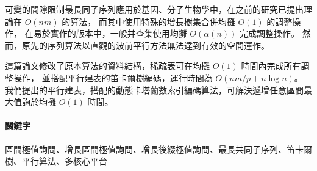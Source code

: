 \begin{abstractCH}

可變的間隙限制最長同子序列應用於基因、分子生物學中，在之前的研究已提出理論在 $O(nm)$ 的算法，
而其中使用特殊的增長樹集合併均攤 $O(1)$ 的調整操作，
在易於實作的版本中，一般并查集使用均攤 $O(\alpha(n))$ 完成調整操作。
然而，原先的序列算法以直觀的波前平行方法無法達到有效的空間運作。

這篇論文修改了原本算法的資料結構，稀疏表可在均攤 $O(1)$ 時間內完成所有調整操作，
並搭配平行建表的笛卡爾樹編碼，運行時間為 $O(nm / p + n \log n)$。
我們提出的平行建表，搭配的動態卡塔蘭數索引編碼算法，可解決遞增任意區間最大值詢於均攤 $O(1)$ 時間。

\paragraph{關鍵字} 
區間極值詢問、增長區間極值詢問、增長後綴極值詢問、最長共同子序列、笛卡爾樹、平行算法、多核心平台

\end{abstractCH}